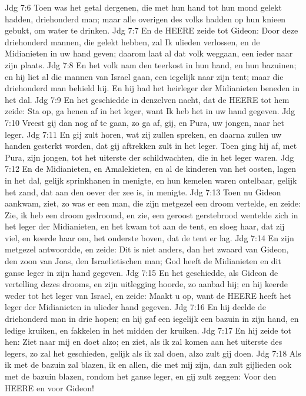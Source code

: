 Jdg 7:6  Toen was het getal dergenen, die met hun hand tot hun mond gelekt hadden, driehonderd man; maar alle overigen des volks hadden op hun knieen gebukt, om water te drinken.
Jdg 7:7  En de HEERE zeide tot Gideon: Door deze driehonderd mannen, die gelekt hebben, zal Ik ulieden verlossen, en de Midianieten in uw hand geven; daarom laat al dat volk weggaan, een ieder naar zijn plaats.
Jdg 7:8  En het volk nam den teerkost in hun hand, en hun bazuinen; en hij liet al die mannen van Israel gaan, een iegelijk naar zijn tent; maar die driehonderd man behield hij. En hij had het heirleger der Midianieten beneden in het dal.
Jdg 7:9  En het geschiedde in denzelven nacht, dat de HEERE tot hem zeide: Sta op, ga henen af in het leger, want Ik heb het in uw hand gegeven.
Jdg 7:10  Vreest gij dan nog af te gaan, zo ga af, gij, en Pura, uw jongen, naar het leger.
Jdg 7:11  En gij zult horen, wat zij zullen spreken, en daarna zullen uw handen gesterkt worden, dat gij aftrekken zult in het leger. Toen ging hij af, met Pura, zijn jongen, tot het uiterste der schildwachten, die in het leger waren.
Jdg 7:12  En de Midianieten, en Amalekieten, en al de kinderen van het oosten, lagen in het dal, gelijk sprinkhanen in menigte, en hun kemelen waren ontelbaar, gelijk het zand, dat aan den oever der zee is, in menigte.
Jdg 7:13  Toen nu Gideon aankwam, ziet, zo was er een man, die zijn metgezel een droom vertelde, en zeide: Zie, ik heb een droom gedroomd, en zie, een geroost gerstebrood wentelde zich in het leger der Midianieten, en het kwam tot aan de tent, en sloeg haar, dat zij viel, en keerde haar om, het onderste boven, dat de tent er lag.
Jdg 7:14  En zijn metgezel antwoordde, en zeide: Dit is niet anders, dan het zwaard van Gideon, den zoon van Joas, den Israelietischen man; God heeft de Midianieten en dit ganse leger in zijn hand gegeven.
Jdg 7:15  En het geschiedde, als Gideon de vertelling dezes drooms, en zijn uitlegging hoorde, zo aanbad hij; en hij keerde weder tot het leger van Israel, en zeide: Maakt u op, want de HEERE heeft het leger der Midianieten in ulieder hand gegeven.
Jdg 7:16  En hij deelde de driehonderd man in drie hopen; en hij gaf een iegelijk een bazuin in zijn hand, en ledige kruiken, en fakkelen in het midden der kruiken.
Jdg 7:17  En hij zeide tot hen: Ziet naar mij en doet alzo; en ziet, als ik zal komen aan het uiterste des legers, zo zal het geschieden, gelijk als ik zal doen, alzo zult gij doen.
Jdg 7:18  Als ik met de bazuin zal blazen, ik en allen, die met mij zijn, dan zult gijlieden ook met de bazuin blazen, rondom het ganse leger, en gij zult zeggen: Voor den HEERE en voor Gideon!
